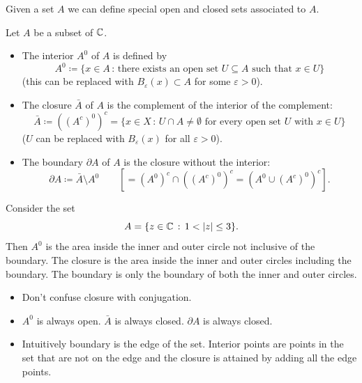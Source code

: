 \documentclass[10pt, a4paper]{article}
\begin{document}
Given a set $A$ we can define special open and closed sets associated to $A$.

\begin{definition}
    Let $A$ be a subset of $\mathbb{C}$.

    \begin{itemize}
        \item The interior $A ^ 0$ of $A$ is defined by
        \[
        A ^ 0 \coloneqq \{x \in A\,:\,\text{there exists an open set $U \subseteq A$ such that $x \in U$}\}
        \]
        (this can be replaced with $B_{\varepsilon}(x) \subset A$ for some $\varepsilon > 0$).
        
        \item The closure $\bar{A}$ of $A$ is the complement of the interior of the complement:
        \[
        \bar{A} \coloneqq \left(\left(A ^ c\right) ^ 0\right) ^ c = \{x \in X\,:\, U \cap A \neq \emptyset\text{ for every open set $U$ with $x \in U$}\}
        \]
        ($U$ can be replaced with $B_{\varepsilon}(x)$ for all $\varepsilon > 0$).
    
        \item The boundary $\partial A$ of $A$ is the closure without the interior:
        \[
        \partial A \coloneqq \bar{A} \setminus A ^ 0\qquad \left[=\left(A ^ 0\right) ^ c \cap \left(\left(A ^ c\right) ^ 0\right) ^ c = \left(A ^ 0 \cup \left(A ^ c\right) ^ 0\right) ^ c\right].
        \]
    \end{itemize}
\end{definition}

\begin{example}
    Consider the set
    \[
    A = \{z \in \mathbb{C}\,:\, 1 < |z| \leq 3\}.
    \]
    Then $A ^ 0$ is the area inside the inner and outer circle not inclusive of the boundary.
    The closure is the area inside the inner and outer circles including the boundary.
    The boundary is only the boundary of both the inner and outer circles.
\end{example}

\begin{remark}\phantom{}
    \begin{itemize}
        \item Don't confuse closure with conjugation.

        \item $A ^ 0$ is always open.
        $\bar{A}$ is always closed.
        $\partial A$ is always closed.

        \item Intuitively boundary is the edge of the set.
        Interior points are points in the set that are not on the edge and the closure is attained by adding all the edge points.
    \end{itemize}
\end{remark}
\end{document}
